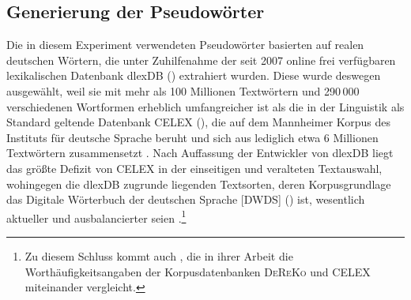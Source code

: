 \subsection{Generierung der Pseudowörter}\label{abs:Generierung}
Die in diesem Experiment verwendeten Pseudowörter basierten auf realen deutschen Wörtern, die unter Zuhilfenahme der seit 2007 online frei verfügbaren lexikalischen Datenbank dlexDB (\citealt[]{Heister.2011}) extrahiert wurden. Diese wurde deswegen ausgewählt, weil sie mit mehr als 100 Millionen Textwörtern und 290\,000 verschiedenen Wortformen erheblich umfangreicher ist als die in der Linguistik als Standard geltende Datenbank CELEX ({\citealt[]{Baayen.1996}}), die auf dem Mannheimer Korpus des Instituts für deutsche Sprache beruht und sich aus lediglich etwa 6 Millionen Textwörtern zusammensetzt {\citep[vgl.][10]{Heister.2011}}.
Nach Auffassung der Entwickler von dlexDB liegt das größte Defizit von {CELEX} in der einseitigen und veralteten Textauswahl, wohingegen die dlexDB zugrunde liegenden Textsorten, deren Korpusgrundlage das Digitale Wörterbuch der deutschen Sprache [DWDS] (\citealt[]{Geyken.2007}) ist, wesentlich aktueller und ausbalancierter seien {\citep[vgl.][11]{Heister.2011}}.\footnote{Zu diesem Schluss kommt auch \citet[50]{Gmoser.2013}, die in ihrer Arbeit die Worthäufigkeitsangaben der Korpusdatenbanken \textsc{DeReKo} und CELEX miteinander vergleicht.}


